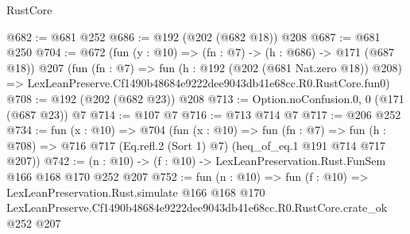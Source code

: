 \begin{lexlean}{RustCore}
\begin{coremodule}
@682 := @681 @252
@686 := @192 (@202 (@682 @18)) @208
@687 := @681 @250
@704 := @672
    (fun (y : @10) => (fn : @7) -> (h : @686) -> @171 (@687 @18))
    @207
    (fun (fn : @7) =>
    fun (h : @192 (@202 (@681 Nat.zero @18)) @208) =>
    LexLeanPreserve.Cf1490b48684e9222dee9043db41e68cc.R0.RustCore.fun0)
@708 := @192 (@202 (@682 @23)) @208
@713 := Option.noConfusion.{0, 0} (@171 (@687 @23)) @7
@714 := @107 @7
@716 := @713 @714 @7
@717 := @206 @252
@734 := fun (x : @10) =>
  @704
    (fun (x : @10) =>
    fun (fn : @7) =>
    fun (h : @708) => @716 @717 (Eq.refl.{2} (Sort 1) @7) (heq_of_eq.{1} @191 @714 @717 @207))
@742 := (n : @10) -> (f : @10) -> LexLeanPreservation.Rust.FunSem @166 @168 @170 @252 @207
@752 := fun (n : @10) =>
  fun (f : @10) =>
  LexLeanPreservation.Rust.simulate
    @166
    @168
    @170
    LexLeanPreserve.Cf1490b48684e9222dee9043db41e68cc.R0.RustCore.crate_ok
    @252
    @207
\end{coremodule}
\end{lexlean}
